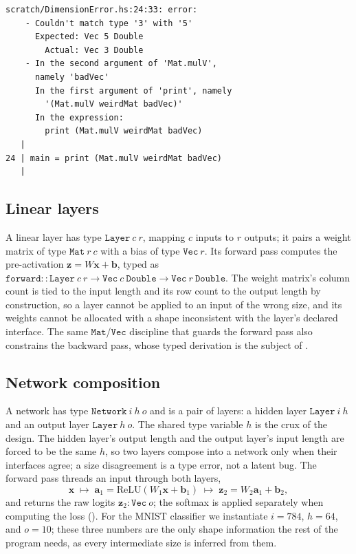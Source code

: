 \documentclass[sigconf,nonacm]{acmart}
\begin{document}
\begin{lstlisting}[float=t, caption={GHC rejects a dimension mismatch at compile time. \texttt{weirdMat} has type \texttt{Mat 10 5 Double}, so \texttt{Mat.mulV} requires a \texttt{Vec 5 Double}; passing a \texttt{Vec 3 Double} is a type error, never reaching runtime.}, label={lst:dimerror}]
scratch/DimensionError.hs:24:33: error:
    - Couldn't match type '3' with '5'
      Expected: Vec 5 Double
        Actual: Vec 3 Double
    - In the second argument of 'Mat.mulV',
      namely 'badVec'
      In the first argument of 'print', namely
        '(Mat.mulV weirdMat badVec)'
      In the expression:
        print (Mat.mulV weirdMat badVec)
   |
24 | main = print (Mat.mulV weirdMat badVec)
   |
\end{lstlisting}

\subsection{Linear layers}
\label{sec:arch:layer}

A linear layer has type \(\mathtt{Layer}\ c\ r\), mapping \(c\) inputs to \(r\)
outputs; it pairs a weight matrix of type \(\mathtt{Mat}\ r\ c\) with a bias of
type \(\mathtt{Vec}\ r\). Its forward pass computes the pre-activation
\(\mathbf{z} = W\mathbf{x} + \mathbf{b}\), typed as
\(\mathtt{forward} :: \mathtt{Layer}\ c\ r \to \mathtt{Vec}\ c\ \mathtt{Double}
\to \mathtt{Vec}\ r\ \mathtt{Double}\). The weight matrix's column count is tied
to the input length and its row count to the output length by construction, so a
layer cannot be applied to an input of the wrong size, and its weights cannot be
allocated with a shape inconsistent with the layer's declared interface. The
same \(\mathtt{Mat}\)/\(\mathtt{Vec}\) discipline that guards the forward pass
also constrains the backward pass, whose typed derivation is the subject of
.

\subsection{Network composition}
\label{sec:arch:network}

A network has type \(\mathtt{Network}\ i\ h\ o\) and is a pair of layers: a
hidden layer \(\mathtt{Layer}\ i\ h\) and an output layer \(\mathtt{Layer}\ h\
o\). The shared type variable \(h\) is the crux of the design. The hidden
layer's output length and the output layer's input length are forced to be the
same \(h\), so two layers compose into a network only when their interfaces
agree; a size disagreement is a type error, not a latent bug. The forward pass
threads an input through both layers,
\[
  \mathbf{x} \;\mapsto\; \mathbf{a}_1 = \mathrm{ReLU}(W_1\mathbf{x} + \mathbf{b}_1)
  \;\mapsto\; \mathbf{z}_2 = W_2\mathbf{a}_1 + \mathbf{b}_2,
\]
and returns the raw logits \(\mathbf{z}_2 : \mathtt{Vec}\ o\); the softmax is
applied separately when computing the loss (\Cref{sec:backprop}). For the MNIST
classifier we instantiate \(i = 784\), \(h = 64\), and \(o = 10\); these three
numbers are the only shape information the rest of the program needs, as every
intermediate size is inferred from them.
\end{document}
